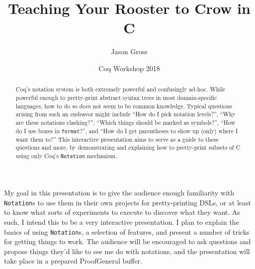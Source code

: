 \documentclass{article}
\title{Teaching Your Rooster to Crow in C}
\author{Jason Gross}
\date{Coq Workshop 2018}
\begin{document}
\maketitle
\begin{abstract}
  Coq's notation system is both extremely powerful and confusingly ad-hoc.
  While powerful enough to pretty-print abstract syntax trees in most domain-specific languages, how to do so does not seem to be common knowledge.
  Typical questions arising from such an endeavor might include ``How do I pick notation levels?'', ``Why are these notations clashing?'', ``Which things should be marked as symbols?'', ``How do I use boxes in \texttt{format}?'', and ``How do I get parentheses to show up (only) where I want them to?''
  This interactive presentation aims to serve as a guide to these questions and more, by demonstrating and explaining how to pretty-print subsets of C using only Coq's \texttt{Notation} mechanism.
\end{abstract}

My goal in this presentation is to give the audience enough familiarity with \texttt{Notation}s to use them in their own projects for pretty-printing DSLs, or at least to know what sorts of experiments to execute to discover what they want.
As such, I intend this to be a very interactive presentation.  I plan to explain the basics of using \texttt{Notation}s, a selection of features, and present a number of tricks for getting things to work.
The audience will be encouraged to ask questions and propose things they'd like to see me do with notations, and the presentation will take place in a prepared ProofGeneral buffer.
\end{document}
